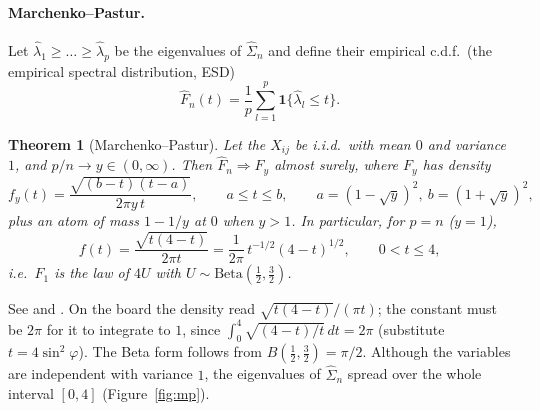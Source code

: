 \documentclass[11pt]{article}
\newtheorem{thm}{Theorem}
\newcommand{\wh}{\widehat}
\begin{document}
\paragraph{Marchenko--Pastur.}

Let $\wh\lambda_1\ge\dots\ge\wh\lambda_p$ be the eigenvalues of $\wh\Sigma_n$ and define their empirical c.d.f.\ (the empirical spectral distribution, ESD)
\[
\wh F_n(t)=\frac1p\sum_{l=1}^p\mathbf 1\{\wh\lambda_l\le t\}.
\]

\begin{thm}[Marchenko--Pastur]\label{thm:mp}
Let the $X_{ij}$ be i.i.d.\ with mean $0$ and variance $1$, and $p/n\to y\in(0,\infty)$. Then $\wh F_n\Rightarrow F_y$ almost surely, where $F_y$ has density
\[
f_y(t)=\frac{\sqrt{(b-t)(t-a)}}{2\pi y\,t},\qquad a\le t\le b,\qquad a=(1-\sqrt y)^2,\ b=(1+\sqrt y)^2,
\]
plus an atom of mass $1-1/y$ at $0$ when $y>1$. In particular, for $p=n$ ($y=1$),
\[
f(t)=\frac{\sqrt{t(4-t)}}{2\pi t}=\frac{1}{2\pi}\,t^{-1/2}(4-t)^{1/2},\qquad0<t\le4,
\]
i.e.\ $F_1$ is the law of $4U$ with $U\sim\mathrm{Beta}(\frac12,\frac32)$.
\end{thm}

See \citet{MP67} and \citet[Ch.~3]{BS10}. On the board the density read $\sqrt{t(4-t)}/(\pi t)$; the constant must be $2\pi$ for it to integrate to $1$, since $\int_0^4\sqrt{(4-t)/t}\,dt=2\pi$ (substitute $t=4\sin^2\varphi$). The Beta form follows from $B(\frac12,\frac32)=\pi/2$. Although the variables are independent with variance $1$, the eigenvalues of $\wh\Sigma_n$ spread over the whole interval $[0,4]$ (Figure~\ref{fig:mp}).
\end{document}
